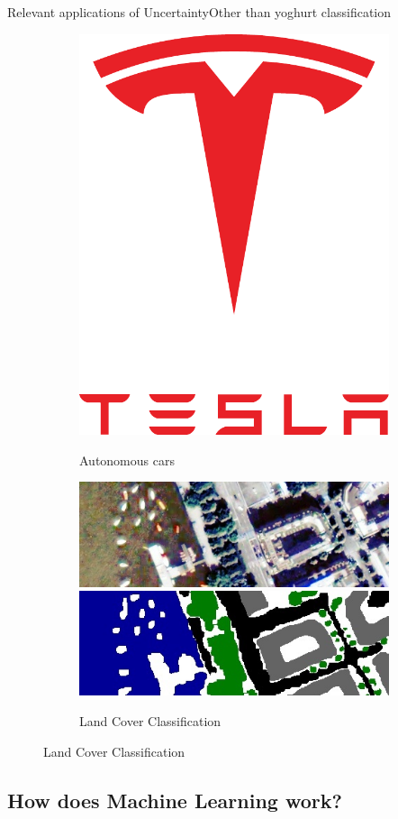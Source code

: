 \documentclass{beamer}
\begin{document}
\begin{frame}{Relevant applications of Uncertainty}{Other than yoghurt classification}
\begin{figure}[H]
\begin{subfigure}{0.26\textwidth}
		\includegraphics[width=.2\textwidth]{Tesla_Motors}\\
		\caption{Autonomous cars}
	\end{subfigure}
	\pause
	\begin{subfigure}{0.38\textwidth}
		\centering
		\includegraphics[width=\textwidth]{Im_11_detail.jpg}
		\includegraphics[width=\textwidth]{GT_11_detail.jpg}
		\caption{Land Cover Classification}
	\end{subfigure}
\end{figure}
\end{frame}

\subsection{How does Machine Learning work?}
\end{document}

